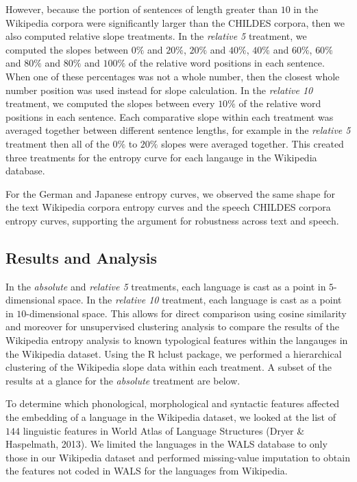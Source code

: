 \documentclass[10pt, letterpaper]{article}
\begin{document}
However, because the portion of sentences of length greater than \(10\)
in the Wikipedia corpora were significantly larger than the CHILDES
corpora, then we also computed relative slope treatments. In the
\emph{relative 5} treatment, we computed the slopes between \(0\%\) and
\(20\%\), \(20\%\) and \(40\%\), \(40\%\) and \(60\%\), \(60\%\) and
\(80\%\) and \(80\%\) and \(100\%\) of the relative word positions in
each sentence. When one of these percentages was not a whole number,
then the closest whole number position was used instead for slope
calculation. In the \emph{relative 10} treatment, we computed the slopes
between every \(10\%\) of the relative word positions in each sentence.
Each comparative slope within each treatment was averaged together
between different sentence lengths, for example in the \emph{relative 5}
treatment then all of the \(0\%\) to \(20\%\) slopes were averaged
together. This created three treatments for the entropy curve for each
langauge in the Wikipedia database.

For the German and Japanese entropy curves, we observed the same shape
for the text Wikipedia corpora entropy curves and the speech CHILDES
corpora entropy curves, supporting the argument for robustness across
text and speech.

\subsection{Results and Analysis}\label{results-and-analysis}

In the \emph{absolute} and \emph{relative 5} treatments, each language
is cast as a point in \(5\)-dimensional space. In the \emph{relative 10}
treatment, each language is cast as a point in \(10\)-dimensional space.
This allows for direct comparison using cosine similarity and moreover
for unsupervised clustering analysis to compare the results of the
Wikipedia entropy analysis to known typological features within the
langauges in the Wikipedia dataset. Using the R hclust package, we
performed a hierarchical clustering of the Wikipedia slope data within
each treatment. A subset of the results at a glance for the
\emph{absolute} treatment are below.

To determine which phonological, morphological and syntactic features
affected the embedding of a language in the Wikipedia dataset, we looked
at the list of \(144\) linguistic features in World Atlas of Language
Structures (Dryer \& Haspelmath, 2013). We limited the languages in the
WALS database to only those in our Wikipedia dataset and performed
missing-value imputation to obtain the features not coded in WALS for
the languages from Wikipedia.
\end{document}
